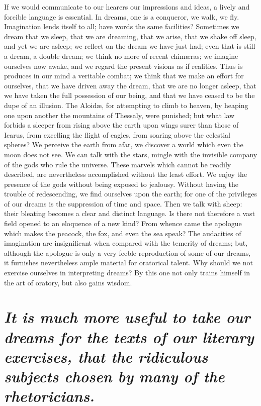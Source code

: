 \documentclass[12pt]{article}
\begin{document}
If we would communicate to our hearers our impressions and ideas, a lively and
forcible language is essential. In dreams, one is a conqueror, we walk, we fly.
Imagination lends itself to all; have words the same facilities? Sometimes we
dream that we sleep, that we are dreaming, that we arise, that we shake off
sleep, and yet we are asleep; we reflect on the dream we have just had; even
that is still a dream, a double dream; we think no more of recent chim{\ae}ras;
we imagine ourselves now awake, and we regard the present visions as if
realities. Thus is produces in our mind a veritable combat; we think that we
make an effort for ourselves, that we have driven away the dream, that we are
no longer asleep, that we have taken the full possession of our being, and that
we have ceased to be the dupe of an illusion. The Aloid{\ae}, for attempting to
climb to heaven, by heaping one upon another the mountains of Thessaly, were
punished; but what law forbids a sleeper from rising above the earth upon wings
surer than those of Icarus, from excelling the flight of eagles, from soaring
above the celestial spheres? We perceive the earth from afar, we discover a
world which even the moon does not see. We can talk with the stars, mingle with
the invisible company of the gods who rule the universe. These marvels which
cannot be readily described, are nevertheless accomplished without the least
effort. We enjoy the presence of the gods without being exposed to jealousy.
Without having the trouble of redescending, we find ourselves upon the earth;
for one of the privileges of our dreams is the suppression of time and space.
Then we talk with sheep: their bleating becomes a clear and distinct language.
Is there not therefore a vast field opened to an eloquence of a new kind? From
whence came the apologue which makes the peacock, the fox, and even the sea
speak? The audacities of imagination are insignificant when compared with the
temerity of dreams; but, although the apologue is only a very feeble
reproduction of some of our dreams, it furnishes nevertheless ample material
for oratorical talent. Why should we not exercise ourselves in interpreting
dreams? By this one not only trains himself in the art of oratory, but also
gains wisdom.


\section{\mdseries\itshape It is much more useful to take our dreams for the
texts of our literary exercises, that the ri\-dic\-u\-lous subjects chosen by
many of the rhetoricians.}
\end{document}
